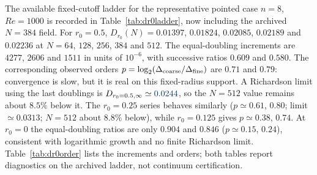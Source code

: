 \documentclass[11pt]{article}
\newcommand{\tabbox}[1]{\resizebox{\ifdim\width>\textwidth\textwidth\else\width\fi}{!}{#1}}
\begin{document}
\begin{table}[H]
\centering
\caption{Thirty-case refinement difference $D_{256}/D_{128}-1$ with a fixed
physical wall cutoff $r_0$.}
\label{tab:juncut}
\tabbox{}
\end{table}
\par

\color{revblue}The available fixed-cutoff ladder for the representative pointed case
\color{black}
\color{revblue}$n=8$, $Re=1000$ is recorded in Table~\ref{tab:dr0ladder}, now including the
\color{black}
\color{revblue}archived $N=384$ field. For $r_0=0.5$, $D_{r_0}(N)=0.01397$, $0.01824$,
\color{black}
\color{revblue}$0.02085$, $0.02189$ and $0.02236$ at $N=64$, $128$, $256$, $384$ and $512$.
\color{black}
\color{revblue}The equal-doubling increments are $4277$, $2606$ and $1511$ in units of
\color{black}
\color{revblue}$10^{-6}$, with successive ratios $0.609$ and $0.580$. The corresponding
\color{black}
\color{revblue}observed orders $p=\log_2(\Delta_{\rm coarse}/\Delta_{\rm fine})$ are $0.71$
\color{black}
\color{revblue}and $0.79$: convergence is slow, but it is real on this fixed-radius support.
\color{black}
\color{revblue}A Richardson limit using the last doublings is $D_{r_0=0.5,\infty}\simeq
\color{black}
\color{revblue}0.0244$, so the $N=512$ value remains about $8.5\%$ below it. The $r_0=0.25$
\color{black}
\color{revblue}series behaves similarly ($p\simeq0.61$, $0.80$; limit $\simeq0.0313$;
\color{black}
\color{revblue}$N=512$ about $8.8\%$ below), while $r_0=0.125$ gives $p\simeq0.38$, $0.74$.
\color{black}
\color{revblue}At $r_0=0$ the equal-doubling ratios are only $0.904$ and $0.846$
\color{black}
\color{revblue}($p\simeq0.15$, $0.24$), consistent with logarithmic growth and no finite
\color{black}
\color{revblue}Richardson limit. Table~\ref{tab:dr0order} lists the increments and orders;
\color{black}
\color{revblue}both tables report diagnostics on the archived ladder, not continuum
\color{black}
\color{revblue}certification.
\color{black}
\end{document}
